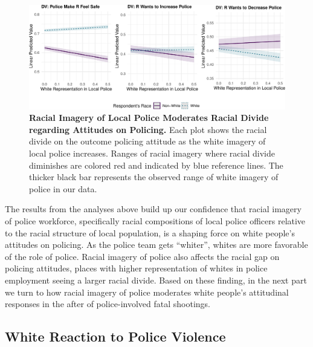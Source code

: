 \documentclass[
  12pt,
]{article}
\begin{document}
\begin{figure}[tb]

{\centering \includegraphics{racialized-police_files/figure-pdf/fig-divides-1.pdf}

}

\caption{\label{fig-divides}\textbf{Racial Imagery of Local Police
Moderates Racial Divide regarding Attitudes on Policing.} Each plot
shows the racial divide on the outcome policing attitude as the white
imagery of local police increases. Ranges of racial imagery where racial
divide diminishes are colored red and indicated by blue reference lines.
The thicker black bar represents the observed range of white imagery of
police in our data.}

\end{figure}

The results from the analyses above build up our confidence that racial
imagery of police workforce, specifically racial compositions of local
police officers relative to the racial structure of local population, is
a shaping force on white people's attitudes on policing. As the police
team gets ``whiter'', whites are more favorable of the role of police.
Racial imagery of police also affects the racial gap on policing
attitudes, places with higher representation of whites in police
employment seeing a larger racial divide. Based on these finding, in the
next part we turn to how racial imagery of police moderates white
people's attitudinal responses in the after of police-involved fatal
shootings.

\hypertarget{white-reaction-to-police-violence}{%
\subsection{White Reaction to Police
Violence}\label{white-reaction-to-police-violence}}
\end{document}
